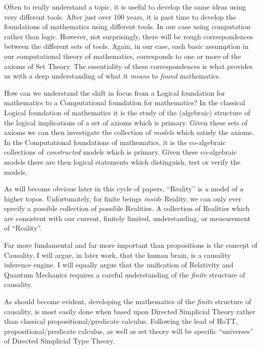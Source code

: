 \documentclass[a4paper,openany]{amsbook}
\begin{document}
Often to really understand a topic, it is useful to develop the same ideas using
very different tools. After just over 100 years, it is past time to develop the
foundations of mathematics using different tools.  In our case using computation
rather than logic. However, not surprisingly, there will be rough
correspondences between the different sets of tools. Again, in our case, each
basic assumption in our computational theory of mathematics, corresponds to one
or more of the axioms of Set Theory. The essentiality of these correspondences
is what provides us with a deep understanding of what it \emph{means} to
\emph{found} mathematics.

How can we understand the shift in focus from a Logical foundation for
mathematics to a Computational foundation for mathematics? In the classical
Logical foundation of mathematics it is the study of the (algebraic) structure
of the logical implications of a set of axioms which is primary. Given these
sets of axioms we can then investigate the collection of \emph{models} which
satisfy the axioms. In the Computational foundations of mathematics, it is the
co-algebraic collections of \emph{constructed} models which is primary.  Given
these co-algebraic models there are then logical statements which distinguish,
test or verify the models.


As will become obvious later in this cycle of papers, ``Reality'' is \emph{a}
model of \emph{a} higher topos.  Unfortunately, for finite beings \emph{inside}
Reality, we can only ever specify a possible collection of possible Realities. A
collection of Realities which are consistent with our current, finitely limited,
understanding, or measurement of ``Reality''.

Far more fundamental and far more important than propositions is the concept of
Causality.  I will argue, in later work, that the human brain, is a causality
inference engine. I will equally argue that the unification of Relativity and
Quantum Mechanics requires a careful understanding of the \emph{finite}
structure of causality.

As should become evident, developing the mathematics of the \emph{finite}
structure of causality, is most easily done when based upon Directed Simplicial
Theory rather than classical propositional/predicate calculus. Following the
lead of HoTT, propositional/predicate calculus, as well as set theory will be
specific ``universes'' of Directed Simplicial Type Theory.
\end{document}

